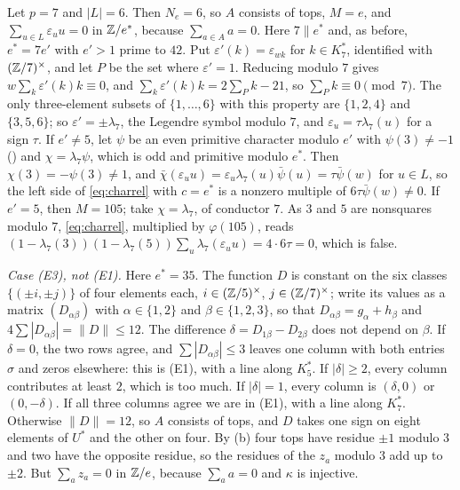 Let $p=7$ and $|L|=6$. Then $N_{e}=6$, so $A$ consists of tops, $M=e$, and
$\sum_{u\in L}\varepsilon_{u}u=0$ in $\mathbb{Z}/e^{*}$, because
$\sum_{a\in A}a=0$. Here $7\parallel e^{*}$ and, as before, $e^{*}=7e'$ with
$e'>1$ prime to $42$. Put $\varepsilon'(k)=\varepsilon_{wk}$ for $k\in
K^{*}_{7}$, identified with $(\mathbb{Z}/7)^{\times}$, and let $P$ be the set where
$\varepsilon'=1$. Reducing modulo $7$ gives $w\sum_{k}\varepsilon'(k)k\equiv
0$, and $\sum_{k}\varepsilon'(k)k=2\sum_{P}k-21$, so $\sum_{P}k\equiv0\pmod
7$. The only three-element subsets of $\{1,\dots,6\}$ with this property are
$\{1,2,4\}$ and $\{3,5,6\}$; so $\varepsilon'=\pm\lambda_{7}$, the Legendre
symbol modulo $7$, and $\varepsilon_{u}=\tau\lambda_{7}(u)$ for a sign
$\tau$. If $e'\ne5$, let $\psi$ be an even primitive character modulo $e'$
with $\psi(3)\ne-1$ () and $\chi=\lambda_{7}\psi$, which is
odd and primitive modulo $e^{*}$. Then $\chi(3)=-\psi(3)\ne1$, and
$\bar\chi(\varepsilon_{u}u)=\varepsilon_{u}\lambda_{7}(u)\bar\psi(u)=
\tau\bar\psi(w)$ for $u\in L$, so the left side of \eqref{eq:charrel} with
$c=e^{*}$ is a nonzero multiple of $6\tau\bar\psi(w)\ne0$. If $e'=5$, then
$M=105$; take $\chi=\lambda_{7}$, of conductor $7$. As $3$ and $5$ are
nonsquares modulo $7$, \eqref{eq:charrel}, multiplied by $\varphi(105)$,
reads $(1-\lambda_{7}(3))(1-\lambda_{7}(5))\sum_{u}\lambda_{7}
(\varepsilon_{u}u)=4\cdot6\tau=0$, which is false.

\emph{Case (E3), not (E1).} Here $e^{*}=35$. The function $D$ is constant on
the six classes $\{(\pm i,\pm j)\}$ of four elements each,
$i\in(\mathbb{Z}/5)^{\times}$, $j\in(\mathbb{Z}/7)^{\times}$; write its values as a matrix
$(D_{\alpha\beta})$ with $\alpha\in\{1,2\}$ and $\beta\in\{1,2,3\}$, so
that $D_{\alpha\beta}=g_{\alpha}+h_{\beta}$ and $4\sum|D_{\alpha\beta}|=\|D\|
\le12$. The difference $\delta=D_{1\beta}-D_{2\beta}$ does not depend on
$\beta$. If $\delta=0$, the two rows agree, and $\sum|D_{\alpha\beta}|\le3$
leaves one column with both entries $\sigma$ and zeros elsewhere: this is
(E1), with a line along $K^{*}_{5}$. If $|\delta|\ge2$, every column
contributes at least $2$, which is too much. If $|\delta|=1$, every column
is $(\delta,0)$ or $(0,-\delta)$. If all three columns agree we are in (E1),
with a line along $K^{*}_{7}$. Otherwise $\|D\|=12$, so $A$ consists of
tops, and $D$ takes one sign on eight elements of $U^{*}$ and the other on
four. By (b) four tops have residue $\pm1$ modulo $3$ and two
have the opposite residue, so the residues of the $z_{a}$ modulo $3$ add up
to $\pm2$. But $\sum_{a}z_{a}=0$ in $\mathbb{Z}/e$, because $\sum_{a}a=0$ and
$\kappa$ is injective.

